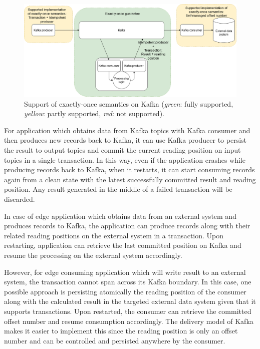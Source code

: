 \begin{figure}[h]
	\centering
	\includegraphics[width=\linewidth]{images/exactly-once-kafka.png}
	\caption{Support of exactly-once semantics on Kafka (\emph{green}: fully supported, \emph{yellow}: partly supported, \emph{red}: not supported).}
	\label{fig:exactlyoncekafka}
\end{figure}


For application which obtains data from Kafka topics with Kafka consumer and then produces new records back to Kafka, it can use Kafka producer to persist the result to output topics and commit the current reading position on input topics in a single transaction. In this way, even if the application crashes while producing records back to Kafka, when it restarts, it can start consuming records again from a clean state with the latest successfully committed result and reading position. Any result generated in the middle of a failed transaction will be discarded. 

In case of edge application which obtains data from an external system and produces records to Kafka, the application can produce records along with their related reading positions on the external system in a transaction. Upon restarting, application can retrieve the last committed position on Kafka and resume the processing on the external system accordingly. 

However, for edge consuming application which will write result to an external system, the transaction cannot span across its Kafka boundary. In this case, one possible approach is persisting atomically the reading position of the consumer along with the calculated result in the targeted external data system given that it supports transactions. Upon restarted, the consumer can retrieve the committed offset number and resume consumption accordingly. The delivery model of Kafka makes it easier to implement this since the reading position is only an offset number and can be controlled and persisted anywhere by the consumer.


